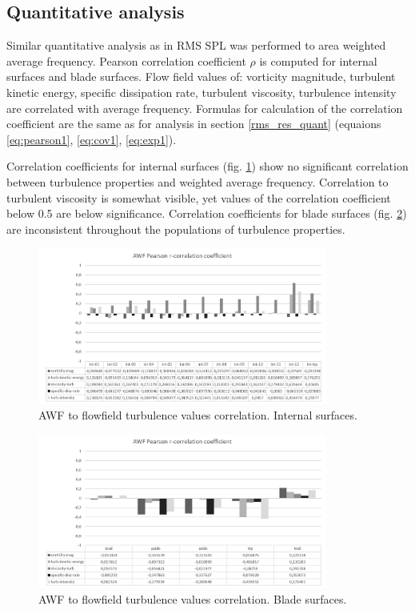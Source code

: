\subsection{Quantitative analysis} \label{fft_res_quant}
Similar quantitative analysis as in RMS SPL was performed to area weighted average frequency. Pearson correlation coefficient $\rho$ is computed for internal surfaces and blade surfaces. Flow field values of: vorticity magnitude, turbulent kinetic energy, specific dissipation rate, turbulent viscosity, turbulence intensity are correlated with average frequency. Formulas for calculation of the correlation coefficient are the same as for analysis in section \ref{rms_res_quant} (equaions \ref{eq:pearson1}, \ref{eq:cov1}, \ref{eq:exp1}).

Correlation coefficients for internal surfaces (fig. \ref{awf_corr_int}) show no significant correlation between turbulence properties and weighted average frequency. Correlation to turbulent viscosity is somewhat visible, yet values of the correlation coefficient below 0.5 are below significance. Correlation coefficients for blade surfaces (fig. \ref{awf_corr_blade}) are inconsistent throughout the populations of turbulence properties. 

\begin{figure}[h!]
\centering %
\includegraphics[width=0.85\textwidth]{Pictures/awf_pearson_int.png}
\caption{AWF to flowfield turbulence values correlation. Internal surfaces.}
\label{awf_corr_int}
\end{figure}

\begin{figure}[h!]
\centering %
\includegraphics[width=0.85\textwidth]{Pictures/awf_pearson_blade.png}
\caption{AWF to flowfield turbulence values correlation. Blade surfaces.}
\label{awf_corr_blade}
\end{figure}